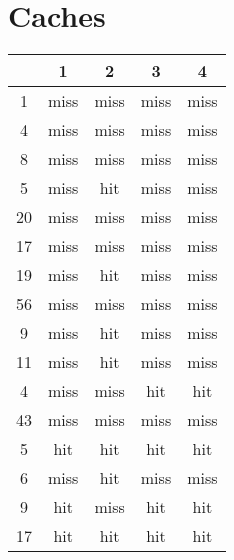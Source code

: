 \documentclass[a4paper,11pt]{article}
\begin{document}
\section{Caches}
\begin{center}
	\begin{tabular} {c|c|c|c|c} \hline
	 & 1 & 2 & 3 & 4 \\ \hline
	 1 & miss & miss & miss & miss \\ \hline 
	 4 & miss & miss & miss & miss \\ \hline
	 8 & miss & miss & miss & miss \\ \hline
	 5 & miss & hit & miss & miss \\ \hline
	 20 & miss & miss & miss & miss \\ \hline
	 17 & miss & miss & miss & miss \\ \hline
	 19 & miss & hit & miss & miss \\ \hline
	 56 & miss & miss & miss & miss \\ \hline
	 9 & miss & hit & miss & miss \\ \hline
	 11 & miss & hit & miss & miss \\ \hline
	 4 & miss & miss & hit & hit \\ \hline
	 43 & miss & miss & miss & miss \\ \hline
	 5 & hit & hit & hit & hit \\ \hline
	 6 & miss & hit & miss & miss \\ \hline
	 9 & hit & miss & hit & hit \\ \hline
	 17 & hit & hit & hit & hit \\ \hline
		
	\end{tabular}
\end{center}
\end{document}
